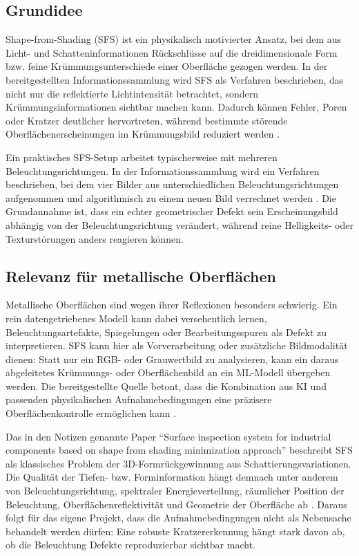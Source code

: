 \documentclass[11pt,a4paper]{article}
\begin{document}
\subsection{Grundidee}

Shape-from-Shading (SFS) ist ein physikalisch motivierter Ansatz, bei dem aus Licht- und Schatteninformationen Rückschlüsse auf die dreidimensionale Form bzw. feine Krümmungsunterschiede einer Oberfläche gezogen werden. In der bereitgestellten Informationssammlung wird SFS als Verfahren beschrieben, das nicht nur die reflektierte Lichtintensität betrachtet, sondern Krümmungsinformationen sichtbar machen kann. Dadurch können Fehler, Poren oder Kratzer deutlicher hervortreten, während bestimmte störende Oberflächenerscheinungen im Krümmungsbild reduziert werden \cite{ersteinfos}.

Ein praktisches SFS-Setup arbeitet typischerweise mit mehreren Beleuchtungsrichtungen. In der Informationssammlung wird ein Verfahren beschrieben, bei dem vier Bilder aus unterschiedlichen Beleuchtungsrichtungen aufgenommen und algorithmisch zu einem neuen Bild verrechnet werden \cite{ersteinfos}. Die Grundannahme ist, dass ein echter geometrischer Defekt sein Erscheinungsbild abhängig von der Beleuchtungsrichtung verändert, während reine Helligkeits- oder Texturstörungen anders reagieren können.

\subsection{Relevanz für metallische Oberflächen}

Metallische Oberflächen sind wegen ihrer Reflexionen besonders schwierig. Ein rein datengetriebenes Modell kann dabei versehentlich lernen, Beleuchtungsartefakte, Spiegelungen oder Bearbeitungsspuren als Defekt zu interpretieren. SFS kann hier als Vorverarbeitung oder zusätzliche Bildmodalität dienen: Statt nur ein RGB- oder Grauwertbild zu analysieren, kann ein daraus abgeleitetes Krümmungs- oder Oberflächenbild an ein ML-Modell übergeben werden. Die bereitgestellte Quelle betont, dass die Kombination aus KI und passenden physikalischen Aufnahmebedingungen eine präzisere Oberflächenkontrolle ermöglichen kann \cite{ersteinfos}.

Das in den Notizen genannte Paper \enquote{Surface inspection system for industrial components based on shape from shading minimization approach} beschreibt SFS als klassisches Problem der 3D-Formrückgewinnung aus Schattierungsvariationen. Die Qualität der Tiefen- bzw. Forminformation hängt demnach unter anderem von Beleuchtungsrichtung, spektraler Energieverteilung, räumlicher Position der Beleuchtung, Oberflächenreflektivität und Geometrie der Oberfläche ab \cite{ersteinfos,sfs_paper}. Daraus folgt für das eigene Projekt, dass die Aufnahmebedingungen nicht als Nebensache behandelt werden dürfen: Eine robuste Kratzererkennung hängt stark davon ab, ob die Beleuchtung Defekte reproduzierbar sichtbar macht.
\end{document}

